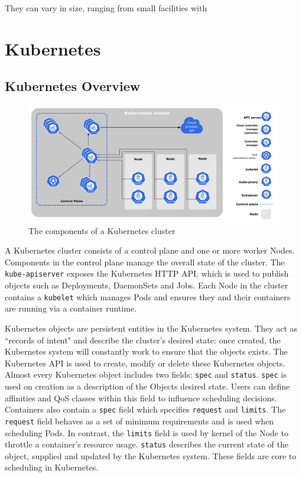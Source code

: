 They can vary in size, ranging from small facilities with

\section{Kubernetes}

\subsection{Kubernetes Overview}

\begin{figure}[ht]
    \centering
    \includegraphics[width=\textwidth]{images/components-of-kubernetes.pdf}
    \caption{The components of a Kubernetes cluster~\cite{kubernetes-components}}
    \label{kube-components}
\end{figure}

A Kubernetes cluster consists of a control plane and one or more worker Nodes.
Components in the control plane manage the overall state of the cluster. The
\verb|kube-apiserver| exposes the Kubernetes HTTP API, which is used to publish
objects such as Deployments, DaemonSets and Jobs. Each
Node in the cluster contains a \verb|kubelet| which manages Pods and ensures
they and their containers are running via a container runtime.

Kubernetes objects are persistent entities in the Kubernetes system. They act as
``records of intent" and describe the cluster's desired state: once created, the
Kubernetes system will constantly work to ensure that the objects exists. The
Kubernetes API is used to create, modify or delete these Kubernetes objects. Almost
every Kubernetes object includes two fields: \verb|spec| and \verb|status|.
\verb|spec| is used on creation as a description of the Objects desired state.
Users can define affinities and QoS classes within this field to influence
scheduling decisions. Containers also contain a \verb|spec| field which
specifies \verb|request| and \verb|limits|. The \texttt{request} field behaves
as a set of minimum requirements and is used when scheduling Pods. In contrast,
the \texttt{limits} field is used by kernel of the Node to throttle a
container's resource usage. \verb|status| describes the current state of the
object, supplied and updated by the Kubernetes system. These fields are core to
scheduling in Kubernetes.

